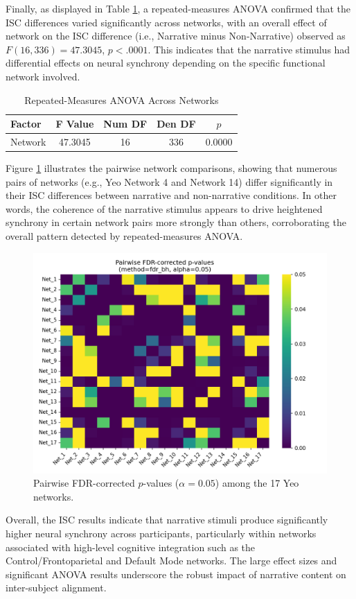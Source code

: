 \documentclass[stu,12pt,floatsintext]{apa7}
\begin{document}
Finally, as displayed in Table \ref{tab:anova}, a repeated-measures ANOVA confirmed that the ISC differences varied significantly across networks, with an overall effect of network on the ISC difference (i.e., Narrative minus Non-Narrative) observed as $F(16, 336) = 47.3045$, $p < .0001$. This indicates that the narrative stimulus had differential effects on neural synchrony depending on the specific functional network involved.

\begin{table}[ht!]
\centering
\caption{Repeated-Measures ANOVA Across Networks}
\label{tab:anova}
\begin{tabular}{lcccc}
\hline
\textbf{Factor} & \textbf{F Value} & \textbf{Num DF} & \textbf{Den DF} & \textbf{$p$} \\
\hline
Network       & 47.3045 & 16 & 336 & 0.0000 \\
\hline
\end{tabular}
\end{table}

Figure \ref{fig:heatmap} illustrates the pairwise network comparisons, showing that numerous pairs of networks (e.g., Yeo Network 4 and Network 14) differ significantly in their ISC differences between narrative and non-narrative conditions. In other words, the coherence of the narrative stimulus appears to drive heightened synchrony in certain network pairs more strongly than others, corroborating the overall pattern detected by repeated-measures ANOVA.

\begin{figure}[ht!]
\centering
\includegraphics[width=0.65\linewidth]{Results/Plots/Pairwise_Network_Heatmap.png}
\caption{Pairwise FDR-corrected $p$-values ($\alpha=0.05$) among the 17 Yeo networks.}
\label{fig:heatmap}
\end{figure}

Overall, the ISC results indicate that narrative stimuli produce significantly higher neural synchrony across participants, particularly within networks associated with high-level cognitive integration such as the Control/Frontoparietal and Default Mode networks. The large effect sizes and significant ANOVA results underscore the robust impact of narrative content on inter-subject alignment.
\end{document}
